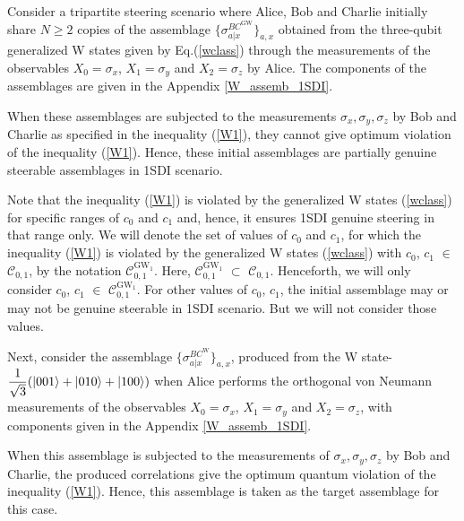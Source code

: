 \documentclass[reprint,superscriptaddress,nofootinbib,amsmath,amssymb,aps,pra,longbibliography]{revtex4-1}
\begin{document}
  Consider a tripartite steering scenario where Alice, Bob and Charlie initially  share $N \geq 2$ copies of the assemblage $\{\sigma_{a|x}^{BC^{\text{GW}}}\}_{a,x}$ obtained from the three-qubit  generalized W states given by Eq.(\ref{wclass}) through the measurements of the observables $X_0=\sigma_x$, $X_1=\sigma_y$ and $X_2=\sigma_z$ by Alice. The components of the assemblages are given in the Appendix \ref{W_assemb_1SDI}.



When these assemblages are subjected to the measurements $ \sigma_x,  \sigma_y,  \sigma_z$ by Bob and  Charlie as specified in the inequality (\ref{W1}), they cannot give optimum violation of the inequality (\ref{W1}). Hence,  these initial assemblages are partially genuine steerable assemblages in 1SDI scenario. 



Note that the inequality (\ref{W1}) is violated by the generalized W states (\ref{wclass}) for specific ranges of $c_0$ and $c_1$  and, hence, it ensures 1SDI genuine steering in that range only. We will denote the set of values of $c_0$ and $c_1$, for which the inequality (\ref{W1}) is violated by the generalized W states (\ref{wclass}) with $c_0$, $c_1$ $\in$ $\mathcal{C}_{0,1}$, by the notation $\mathcal{C}^{\text{GW}_1}_{0,1}$. Here, $\mathcal{C}^{\text{GW}_1}_{0,1}$ $\subset$ $\mathcal{C}_{0,1}$. Henceforth, we will only consider $c_0$, $c_1$ $\in$ $\mathcal{C}^{\text{GW}_1}_{0,1}$. For other values of $c_0$, $c_1$, the initial assemblage may or may not be genuine steerable in 1SDI scenario. But we will not consider those values.


Next, consider the assemblage $\{\sigma_{a|x}^{BC^{\text{W}}}\}_{a,x}$, produced from the W state- $\dfrac{1}{\sqrt{3}}(\ket{001} + \ket{010} + \ket{100})$ when Alice performs the orthogonal von Neumann measurements of the observables $X_0=\sigma_x$, $X_1= \sigma_y$ and $X_2=\sigma_z$,  with components given in the Appendix \ref{W_assemb_1SDI}.

When this assemblage is subjected to the  measurements of $\sigma_x,  \sigma_y, \sigma_z$ by Bob and Charlie,  the produced correlations give the optimum quantum violation of the inequality (\ref{W1}). Hence,  this assemblage is taken as the target assemblage for this case.
\end{document}
